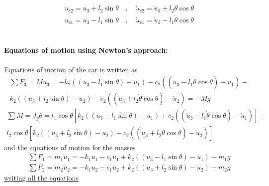 \documentclass[]{report}
\begin{document}
\begin{eqnarray*}
u_{c2}=u_3+l_2 \sin{\theta} \quad ,\quad \dot{u}_{c2}=\dot{u}_3+l_2 \dot{\theta} \cos{\theta} \\
u_{c1}=u_3-l_1 \sin{\theta} \quad ,\quad \dot{u}_{c1}=\dot{u}_3-l_1 \dot{\theta} \cos{\theta}  
\end{eqnarray*}\\
\\
\textbf{Equations of motion using Newton's approach:}\\
\\
Equations of motion of the car is written as
\begin{eqnarray*}
\sum F_3 =M \ddot{u}_3=-k_2\left(\left(u_3-l_1 \sin{\theta}\right) -u_1\right)-c_2\left(\left(\dot{u}_3 -l_1 \dot{\theta} \cos{\theta}\right)-\dot{u}_1\right)-\\
k_2\left(\left(u_3+l_2 \sin{\theta}\right) -u_2\right)-c_2\left(\left(\dot{u}_3 +l_2 \dot{\theta} \cos{\theta}\right)-\dot{u}_2\right)=-Mg
\end{eqnarray*}
\begin{eqnarray*}
\sum M =J_g \ddot{\theta}=l_1 \cos{\theta} \left[ k_2\left(\left(u_3-l_1 \sin{\theta}\right) -u_1\right)+c_2\left(\left(\dot{u}_3 -l_1 \dot{\theta} \cos{\theta}\right)-\dot{u}_1 \right) \right]-\\
l_2 \cos{\theta} \left[k_2\left(\left(u_3+l_2 \sin{\theta}\right) -u_2\right)-c_2\left(\left(\dot{u}_3 +l_2 \dot{\theta} \cos{\theta}\right)-\dot{u}_2\right)\right]
\end{eqnarray*}
and the equations of motion for the masses
\begin{eqnarray*}
\sum F_1 = m_1 \ddot{u}_1=-k_1 u_1 -c_1\dot{u}_1+k_2\left(\left(u_3-l_1\sin{\theta}\right)-u_1\right)-m_1g
\end{eqnarray*}
\begin{eqnarray*}
\sum F_2 = m_2 \ddot{u}_2=-k_1 u_2 -c_1\dot{u}_2+k_2\left(\left(u_3+l_2\sin{\theta}\right)-u_2\right)-m_2g
\end{eqnarray*}
\underline{writing all the equations}
\end{document}
